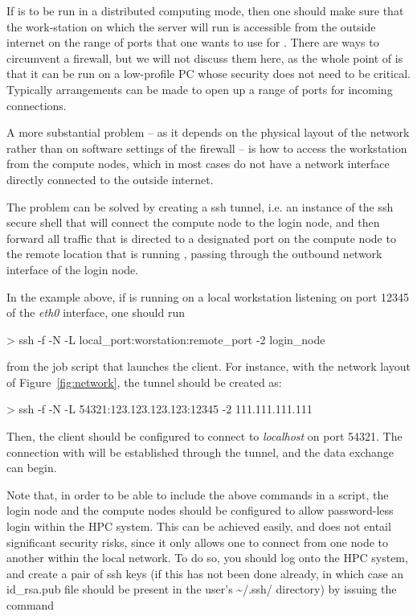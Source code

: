 \documentclass[11pt,english,fleqn]{report}
\newenvironment{code}{%
\footnotesize 
\verbatim
}{
\endverbatim
\normalsize
}
\begin{document}
\label{ssh_sockets}

If \ipi is to be run in a distributed computing mode, then one should
make sure that the work-station on which the server will run is accessible from
the outside internet on the range of ports that one wants to use for
\ipi. There are ways to circumvent a firewall, but we will not discuss them
here, as the whole point of \ipi is that it can be run on a low-profile
PC whose security does not need to be critical. Typically arrangements
can be made to open up a range of ports for incoming connections. 

A more substantial problem -- as it depends on the physical layout
of the network rather than on software settings of the firewall --
is how to access the workstation from the compute nodes, which in most
cases do not have a network interface directly connected to the 
outside internet.

The problem can be solved by creating a ssh tunnel, i.e. an instance of
the ssh secure shell that will connect the compute node to the login node, 
and then forward all traffic that is directed to a designated port
on the compute node to the remote location that is running \ipi, passing
through the outbound network interface of the login node. 

In the example above, if \ipi{} is running on a local workstation listening
on port 12345 of the \emph{eth0} interface, one should run 

\begin{code}
> ssh -f -N -L local_port:worstation:remote_port -2 login_node
\end{code}

from the job script that launches the client. 
For instance, with the network layout of Figure~\ref{fig:network}, the
tunnel should be created as:

\begin{code}
> ssh -f -N -L 54321:123.123.123.123:12345 -2 111.111.111.111
\end{code}

Then, the client should be configured to connect to \emph{localhost}
on port 54321. The connection with \ipi will be established through the tunnel,
and the data exchange can begin.

Note that, in order to be able to include the above commands in a script,
the login node and the compute nodes should be configured to allow 
password-less login within the HPC system. This can be achieved easily, and
does not entail significant security risks, since it only allows one to 
connect from one node to another within the local network.
To do so, you should log onto the HPC system, and create a pair 
of ssh keys (if this has not been done already, in which case an 
id\_rsa.pub file should be present in the user's \textasciitilde{}/.ssh/ directory) 
by issuing the command 
\end{document}
